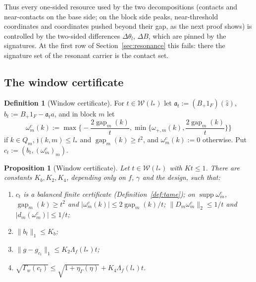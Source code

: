 \documentclass[10pt]{amsart}
\newtheorem{proposition}[theorem]{Proposition}
\theoremstyle{definition}
\newtheorem{definition}[theorem]{Definition}
\theoremstyle{remark}
\newcommand{\supp}{\operatorname{supp}}
\newcommand{\gap}{\operatorname{gap}}
\newcommand{\zh}{\hat z}
\begin{document}
Thus every one-sided resource used by the two decompositions (contacts and
near-contacts on the base side; on the block side peaks, near-threshold
coordinates and coordinates pushed beyond their gap, as the next proof
shows) is controlled by the two-sided differences $\Delta\theta_l$, $\Delta B$,
which are pinned by the signatures.  At the first row of
Section~\ref{sec:resonance} this fails: there the signature set of the
resonant carrier is the contact set.

\subsection{The window certificate}

\begin{definition}[Window certificate]\label{def:windowcert}
For $t\in\mathcal W(l_*)$ let $\mathfrak a_t:=(B_+1_F)(\zh)$,
$b_t:=B_+1_F-\mathfrak a_ta$, and in block $m$ let
\[
 \omega^c_m(k):=\max\Big\{-\frac{2\gap_m(k)}t,\min\Big\{\omega_{+,m}(k),
 \frac{2\gap_m(k)}t\Big\}\Big\}
\]
if $k\in Q_m$, $\mathfrak j(k,m)\le l_*$ and $\gap_m(k)\ge t^2$, and
$\omega^c_m(k):=0$ otherwise.  Put $c_t:=(b_t,(\omega^c_m)_m)$.
\end{definition}

\begin{proposition}[Window certificate]\label{prop:windowcert}
Let $t\in\mathcal W(l_*)$ with $Kt\le1$.  There are constants $K_b,K_2,K_4$,
depending only on $f$, $\gamma$ and the design, such that:
\begin{enumerate}
\item[(a)] $c_t$ is a balanced finite certificate (Definition~\ref{def:tame});
on $\supp\omega^c_m$, $\gap_m(k)\ge t^2$ and $|\omega^c_m(k)|\le
2\gap_m(k)/t$; $\|D_m\omega^c_m\|_2\le1/t$ and $|d_m(\omega^c_m)|\le1/t$;
\item[(b)] $\|b_t\|_1\le K_b$;
\item[(c)] $\|g-g_{c_t}\|_1\le K_2\Lambda_f(l_*)t$;
\item[(d)] $\sqrt{\Gamma_w(c_t)}\le\sqrt{1+\eta_\Gamma(\eta)}+K_4\Lambda_f(l_*)t$.
\end{enumerate}
\end{proposition}
\end{document}
